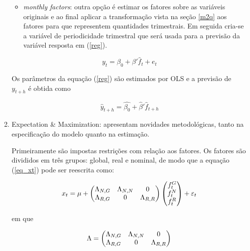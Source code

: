 \documentclass{article}
\begin{document}
\begin{enumerate}
\begin{itemize}
\item \textit{monthly factors}: outra opção é estimar os fatores sobre as variáveis originais e ao final aplicar a transformação vista na seção \ref{m2q} aos fatores para que representem quantidades trimestrais. Em seguida cria-se a variável de periodicidade trimestral que será usada para a previsão da variável resposta em (\ref{reg}).
\end{itemize}




\begin{equation}\label{reg}
y_t = \beta_0 + \beta' \hat{f}_t  + e_t
\end{equation}

Os parâmetros da equação (\ref{reg}) são estimados por OLS e a previsão de $y_{t+h}$ é obtida como

\begin{equation}
\hat{y}_{t+h} = \hat{\beta_0} + \hat{\beta}' \hat{f}_{t+h}
\end{equation}

\item Expectation \& Maximization: \cite{banburaetal2011} apresentam novidades metodológicas, tanto na especificação do modelo quanto na estimação.

Primeiramente são impostas restrições com relação aos fatores. Os fatores são divididos em três grupos: global, real e nominal, de modo que a equação (\ref{eq_xt}) pode ser reescrita como:

\begin{equation}
x_t = \mu + \begin{pmatrix}
  \Lambda_{N,G} & \Lambda_{N,N}  & 0\\
  \Lambda_{R,G} & 0  & \Lambda_{R,R}
\end{pmatrix}
\begin{pmatrix}
  f_t^G \\
  f_t^N \\
  f_t^R
\end{pmatrix} + \varepsilon_t\\
\end{equation}

em que

\begin{equation}
\Lambda = \begin{pmatrix}
  \Lambda_{N,G} & \Lambda_{N,N}  & 0\\
  \Lambda_{R,G} & 0  & \Lambda_{R,R}
\end{pmatrix}\\
\end{equation}


\end{enumerate}
\end{document}
